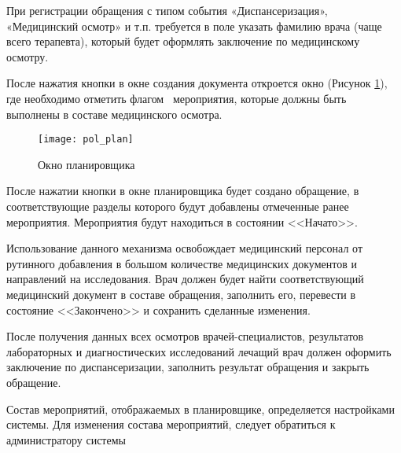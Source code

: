 При регистрации обращения с типом события «Диспансеризация», «Медицинский осмотр» и т.п. требуется в поле  указать фамилию врача (чаще всего терапевта), который будет оформлять заключение по медицинскому осмотру. 

После нажатия кнопки  в окне создания документа откроется окно  (Рисунок \ref{img_pol_plan}), где необходимо отметить флагом \putx~мероприятия, которые должны быть выполнены в составе медицинского осмотра.

 \begin{figure}[ht!]\centering
   \texttt{[image: pol\_plan]}
   \caption{Окно планировщика}
   \label{img_pol_plan}
 \end{figure}
 
После нажатии кнопки  в окне планировщика будет создано обращение, в соответствующие разделы которого будут добавлены отмеченные ранее мероприятия. Мероприятия будут находиться в состоянии <<Начато>>. 

Использование данного механизма освобождает медицинский персонал от рутинного добавления в большом количестве медицинских документов и направлений на исследования. Врач должен будет найти соответствующий медицинский документ в составе обращения, заполнить его, перевести в состояние <<Закончено>> и сохранить сделанные изменения.

После получения данных всех осмотров врачей-специалистов, результатов лабораторных и диагностических исследований лечащий врач должен оформить заключение по диспансеризации, заполнить результат обращения и закрыть обращение.

\begin{prim}
Состав мероприятий, отображаемых в планировщике, определяется настройками системы. Для изменения состава мероприятий, следует обратиться к администратору системы
\end{prim}